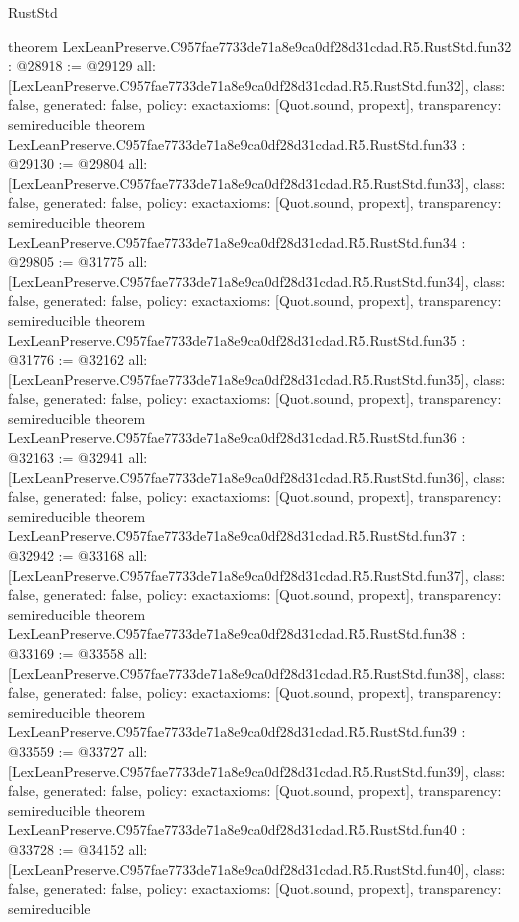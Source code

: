 \begin{lexlean}{RustStd}
\begin{coremodule}
{}
theorem LexLeanPreserve.C957fae7733de71a8e9ca0df28d31cdad.R5.RustStd.fun32 : @28918 := @29129 {
  all: [LexLeanPreserve.C957fae7733de71a8e9ca0df28d31cdad.R5.RustStd.fun32],
  class: false,
  generated: false,
  policy: exact{axioms: [Quot.sound, propext]},
  transparency: semireducible
}
theorem LexLeanPreserve.C957fae7733de71a8e9ca0df28d31cdad.R5.RustStd.fun33 : @29130 := @29804 {
  all: [LexLeanPreserve.C957fae7733de71a8e9ca0df28d31cdad.R5.RustStd.fun33],
  class: false,
  generated: false,
  policy: exact{axioms: [Quot.sound, propext]},
  transparency: semireducible
}
theorem LexLeanPreserve.C957fae7733de71a8e9ca0df28d31cdad.R5.RustStd.fun34 : @29805 := @31775 {
  all: [LexLeanPreserve.C957fae7733de71a8e9ca0df28d31cdad.R5.RustStd.fun34],
  class: false,
  generated: false,
  policy: exact{axioms: [Quot.sound, propext]},
  transparency: semireducible
}
theorem LexLeanPreserve.C957fae7733de71a8e9ca0df28d31cdad.R5.RustStd.fun35 : @31776 := @32162 {
  all: [LexLeanPreserve.C957fae7733de71a8e9ca0df28d31cdad.R5.RustStd.fun35],
  class: false,
  generated: false,
  policy: exact{axioms: [Quot.sound, propext]},
  transparency: semireducible
}
theorem LexLeanPreserve.C957fae7733de71a8e9ca0df28d31cdad.R5.RustStd.fun36 : @32163 := @32941 {
  all: [LexLeanPreserve.C957fae7733de71a8e9ca0df28d31cdad.R5.RustStd.fun36],
  class: false,
  generated: false,
  policy: exact{axioms: [Quot.sound, propext]},
  transparency: semireducible
}
theorem LexLeanPreserve.C957fae7733de71a8e9ca0df28d31cdad.R5.RustStd.fun37 : @32942 := @33168 {
  all: [LexLeanPreserve.C957fae7733de71a8e9ca0df28d31cdad.R5.RustStd.fun37],
  class: false,
  generated: false,
  policy: exact{axioms: [Quot.sound, propext]},
  transparency: semireducible
}
theorem LexLeanPreserve.C957fae7733de71a8e9ca0df28d31cdad.R5.RustStd.fun38 : @33169 := @33558 {
  all: [LexLeanPreserve.C957fae7733de71a8e9ca0df28d31cdad.R5.RustStd.fun38],
  class: false,
  generated: false,
  policy: exact{axioms: [Quot.sound, propext]},
  transparency: semireducible
}
theorem LexLeanPreserve.C957fae7733de71a8e9ca0df28d31cdad.R5.RustStd.fun39 : @33559 := @33727 {
  all: [LexLeanPreserve.C957fae7733de71a8e9ca0df28d31cdad.R5.RustStd.fun39],
  class: false,
  generated: false,
  policy: exact{axioms: [Quot.sound, propext]},
  transparency: semireducible
}
theorem LexLeanPreserve.C957fae7733de71a8e9ca0df28d31cdad.R5.RustStd.fun40 : @33728 := @34152 {
  all: [LexLeanPreserve.C957fae7733de71a8e9ca0df28d31cdad.R5.RustStd.fun40],
  class: false,
  generated: false,
  policy: exact{axioms: [Quot.sound, propext]},
  transparency: semireducible
}
\end{coremodule}
\end{lexlean}
